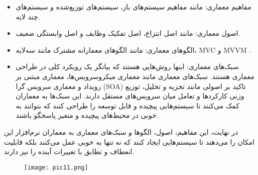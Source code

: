 \begin{itemize}
	\item مفاهیم معماری: مانند مفاهیم سیستم‌های باز، سیستم‌های توزیع‌شده و سیستم‌های چند لایه.
	
	\item اصول معماری:
	 مانند اصل انتزاع، اصل تفکیک وظایف و اصل وابستگی ضعیف.
	
	\item الگوهای معماری:
	 مانند الگوهای معمارانه مشترک مانند سه‌لایه، MVC و MVVM .
	 
	 \item سبک‌های معماری: اینها روش‌هایی هستند که بیانگر یک رویکرد کلی در طراحی معماری هستند. سبک‌های معماری مانند معماری میکروسرویس‌ها، معماری مبتنی بر رویداد و معماری سرویس گرا (SOA) تاکید بر اصولی مانند تجزیه و تحلیل، توزیع وزنی کارکردها و تعامل میان سرویس‌های مستقل دارند. این سبک‌ها به معماران کمک می‌کنند تا سیستم‌هایی پیچیده و قابل توسعه را طراحی کنند که بتوانند به خوبی در محیط‌های پیچیده و متغیر پاسخگو باشند.
	 
\end{itemize}
	 
در نهایت، این مفاهیم، اصول، الگوها و سبک‌های معماری به معماران نرم‌افزار این امکان را می‌دهند تا سیستم‌هایی ایجاد کنند که نه تنها به خوبی عمل می‌کنند بلکه قابلیت انعطاف و تطابق با تغییرات آینده را نیز دارند.

\begin{figure}[H]
	\centering
	\texttt{[image: pic11.png]}
	\label{fig:label4}
\end{figure}


